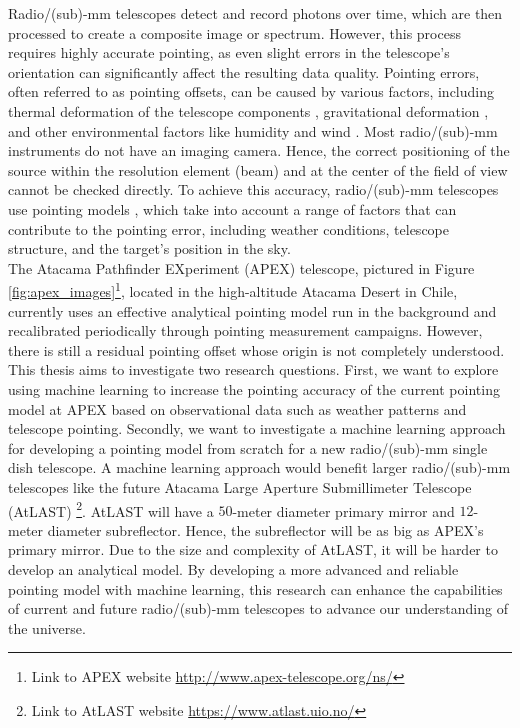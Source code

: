 Radio/(sub)-mm telescopes detect and record photons over time, which are then processed to create a composite image or spectrum.
However, this process requires highly accurate pointing, as even slight errors in the telescope's orientation can significantly affect the resulting data quality.
Pointing errors, often referred to as pointing offsets, can be caused by various factors, including thermal deformation of the telescope components \cite{Dong2018},
gravitational deformation \cite{GravDeformation}, and other environmental factors like humidity \cite{Corstanje2017} and wind \cite{Gawronski2005}.
Most radio/(sub)-mm instruments do not have an imaging camera.
Hence, the correct positioning of the source within the resolution element (beam) and at the center of the field of view cannot be checked directly.
To achieve this accuracy, radio/(sub)-mm telescopes use pointing models \cite{stumpff1972}, which take into account a range of factors that can contribute to the pointing error,
including weather conditions, telescope structure, and the target's position in the sky.\\

The Atacama Pathfinder EXperiment (APEX) telescope, pictured in Figure \ref{fig:apex_images}\footnote[1]{Link to APEX website \href{http://www.apex-telescope.org/ns/}{http://www.apex-telescope.org/ns/}}, located in the high-altitude Atacama Desert in Chile,
currently uses an effective analytical pointing model run in the background and recalibrated periodically through pointing measurement campaigns.
However, there is still a residual pointing offset whose origin is not completely understood.
This thesis aims to investigate two research questions.
First, we want to explore using machine learning to increase the pointing accuracy of the current pointing model at APEX based on observational data such as weather patterns and telescope pointing.
Secondly, we want to investigate a machine learning approach for developing a pointing model from scratch for a new radio/(sub)-mm single dish telescope.
A machine learning approach would benefit larger radio/(sub)-mm telescopes like the future Atacama Large Aperture Submillimeter Telescope (AtLAST)
\footnote[2]{Link to AtLAST website \href{https://www.atlast.uio.no/}{https://www.atlast.uio.no/}}.
AtLAST will have a $50$-meter diameter primary mirror and $12$-meter diameter subreflector. Hence, the subreflector will be as big as APEX's primary mirror.
Due to the size and complexity of AtLAST, it will be harder to develop an analytical model.
By developing a more advanced and reliable pointing model with machine learning,
this research can enhance the capabilities of current and future radio/(sub)-mm telescopes to advance our understanding of the universe.


